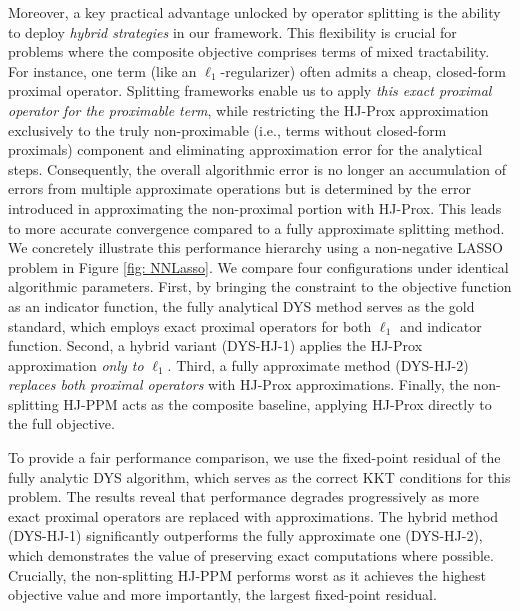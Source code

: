 \documentclass{article}
\theoremstyle{plain}
\theoremstyle{definition}
\theoremstyle{remark}
\begin{document}
Moreover, a key practical advantage unlocked by operator splitting is the ability to deploy \emph{hybrid strategies} in our framework. This flexibility is crucial for problems where the composite objective comprises terms of mixed tractability. For instance, one term (like an $\ell_1$-regularizer) often admits a cheap, closed-form proximal operator. Splitting frameworks enable us to apply \emph{this exact proximal operator for the proximable term}, while restricting the HJ-Prox approximation exclusively to the truly non-proximable (i.e., terms without closed-form proximals) component and eliminating approximation error for the analytical steps. Consequently, the overall algorithmic error is no longer an accumulation of errors from multiple approximate operations but is determined by the error introduced in approximating the non-proximal portion with HJ-Prox. This leads to more accurate convergence compared to a fully approximate splitting method. We concretely illustrate this performance hierarchy using a non-negative LASSO problem in Figure \ref{fig: NNLasso}. We compare four configurations under identical algorithmic parameters. First, by bringing the constraint to the objective function as an indicator function, the fully analytical DYS method serves as the gold standard, which employs exact proximal operators for both  $\ell_1$ and indicator function. Second, a hybrid variant (DYS-HJ-1) applies the HJ-Prox approximation \emph{only to} $\ell_1$. Third, a fully approximate method (DYS-HJ-2) \emph{replaces both proximal operators} with HJ-Prox approximations. Finally, the non-splitting HJ-PPM acts as the composite baseline, applying HJ-Prox directly to the full objective.

To provide a fair performance comparison, we use the fixed-point residual of the fully analytic DYS algorithm, which serves as the correct KKT conditions for this problem. The results reveal that performance degrades progressively as more exact proximal operators are replaced with approximations. The hybrid method (DYS-HJ-1) significantly outperforms the fully approximate one (DYS-HJ-2), which demonstrates the value of preserving exact computations where possible. Crucially, the non-splitting HJ-PPM performs worst as it achieves the highest objective value and more importantly, the largest fixed-point residual. 
\end{document}
